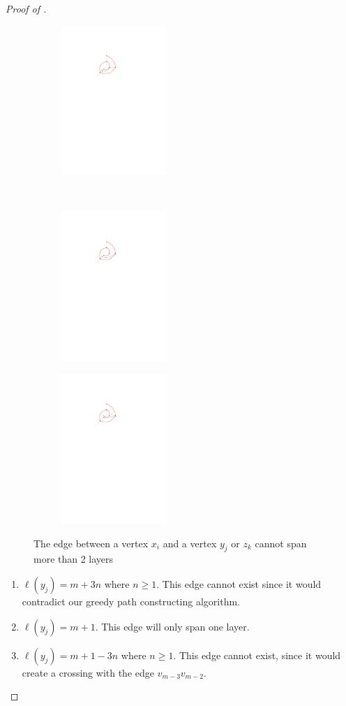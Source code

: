 \documentclass{patmorin}
\begin{document}
\begin{proof}[Proof of ]
\begin{figure}
\begin{center}
    \begin{subfigure}[t]{0.4\hsize}\includegraphics[width=40mm]{figs/2layermaximum-5} \caption{}\end{subfigure}
    \\[2ex]
    \begin{subfigure}[t]{0.4\hsize}\includegraphics[width=40mm]{figs/2layermaximum-6} \caption{}\end{subfigure}
    \begin{subfigure}[t]{0.4\hsize}\includegraphics[width=40mm]{figs/2layermaximum-7} \caption{}\end{subfigure}
    \caption{The edge between a vertex $x_i$ and a vertex $y_j$ or $z_k$ cannot span more than 2 layers}
 \end{center}
    \end{figure}

  \begin{enumerate}
  	\item$\ell(y_j) =  m+3n$ where $n \geq 1$. This edge cannot exist since it would contradict our greedy path constructing algorithm.
  	\item$\ell(y_j) =  m+1$. This edge will only span one layer.
  	\item $\ell(y_j) = m+1-3n$ where $n \geq 1$. This edge cannot exist, since it would create a crossing with the edge $v_{m-3}v_{m-2}$.
  \end{enumerate}


\end{proof}
\end{document}

